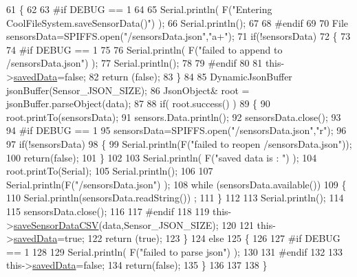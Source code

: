 \begin{DoxyCode}
61 \{
62 
63 \textcolor{preprocessor}{#if DEBUG == 1}
64 
65     Serial.println( F(\textcolor{stringliteral}{"Entering CoolFileSystem.saveSensorData()"}) );
66     Serial.println();
67 
68 \textcolor{preprocessor}{#endif}
69     
70     File sensorsData=SPIFFS.open(\textcolor{stringliteral}{"/sensorsData.json"},\textcolor{stringliteral}{"a+"});
71     \textcolor{keywordflow}{if}(!sensorsData)
72     \{
73     
74 \textcolor{preprocessor}{    #if DEBUG == 1}
75     
76         Serial.println( F(\textcolor{stringliteral}{"failed to append to /sensorsData.json"}) );
77         Serial.println();
78     
79 \textcolor{preprocessor}{    #endif}
80 
81         this->\hyperlink{classCoolFileSystem_ad398e0c5c41a0c88acdf5d672aa71351}{savedData}=\textcolor{keyword}{false};
82         \textcolor{keywordflow}{return} (\textcolor{keyword}{false}); 
83     \}   
84 
85     DynamicJsonBuffer jsonBuffer(Sensor\_JSON\_SIZE);
86     JsonObject& root = jsonBuffer.parseObject(data);
87 
88     \textcolor{keywordflow}{if}( root.success() )
89     \{
90         root.printTo(sensorsData);
91         sensors.Data.println();
92         sensorsData.close();
93 
94 \textcolor{preprocessor}{    #if DEBUG == 1}
95         sensorsData=SPIFFS.open(\textcolor{stringliteral}{"/sensorsData.json"},\textcolor{stringliteral}{"r"});
96         
97         \textcolor{keywordflow}{if}(!sensorsData)
98         \{
99             Serial.println(F(\textcolor{stringliteral}{"failed to reopen /sensorsData.json"}));
100             \textcolor{keywordflow}{return}(\textcolor{keyword}{false});              
101         \}
102     
103         Serial.println( F(\textcolor{stringliteral}{"saved data is : "}) );
104         root.printTo(Serial);
105         Serial.println();
106 
107         Serial.println(F(\textcolor{stringliteral}{"/sensorsData.json"}) );
108         \textcolor{keywordflow}{while} (sensorsData.available()) 
109         \{
110             Serial.println(sensorsData.readString()) ;
111         \}
112         
113         Serial.println();
114         
115         sensorsData.close();
116     
117 \textcolor{preprocessor}{    #endif}
118 
119         this->\hyperlink{classCoolFileSystem_af5a51e2b9bb6e7e7edf75a508fe75f82}{saveSensorDataCSV}(data,Sensor\_JSON\_SIZE);        
120 
121         this->\hyperlink{classCoolFileSystem_ad398e0c5c41a0c88acdf5d672aa71351}{savedData}=\textcolor{keyword}{true};
122         \textcolor{keywordflow}{return} (\textcolor{keyword}{true});      
123     \}
124     \textcolor{keywordflow}{else}
125     \{
126     
127 \textcolor{preprocessor}{    #if DEBUG == 1}
128 
129         Serial.println( F(\textcolor{stringliteral}{"failed to parse json"}) );
130     
131 \textcolor{preprocessor}{    #endif}
132 
133         this->\hyperlink{classCoolFileSystem_ad398e0c5c41a0c88acdf5d672aa71351}{savedData}=\textcolor{keyword}{false};
134         \textcolor{keywordflow}{return}(\textcolor{keyword}{false});
135     \}
136     
137 
138 \}
\end{DoxyCode}
